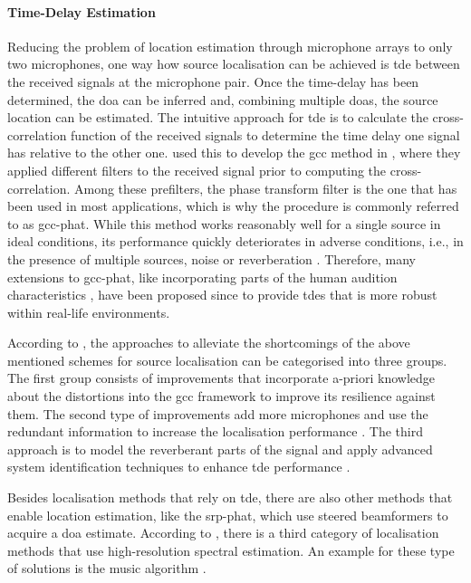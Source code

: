 \paragraph{Time-Delay Estimation}
 Reducing the problem of location estimation through microphone arrays to only two microphones, one way how source localisation can be achieved is \gls{tde} between the received signals at the microphone pair. Once the time-delay has been determined, the \gls{doa} can be inferred and, combining multiple \glspl{doa}, the source location can be estimated. The intuitive approach for \gls{tde} is to calculate the cross-correlation function of the received signals to determine the time delay one signal has relative to the other one. \citeauthor{Knapp1976} used this to develop the \gls{gcc} method in \cite{Knapp1976}, where they applied different filters to the received signal prior to computing the cross-correlation. Among these prefilters, the phase transform filter is the one that has been used in most applications, which is why the procedure is commonly referred to as \gls{gcc-phat}. While this method works reasonably well for a single source in ideal conditions, its performance quickly deteriorates in adverse conditions, i.e., in the presence of multiple sources, noise or reverberation \cite{Bedard1994,Champagne1996}. Therefore, many extensions to \gls{gcc-phat}, like incorporating parts of the human audition characteristics \cite{Wilson2006}, have been proposed since to provide \glspl{tde} that is more robust within real-life environments.
 
According to \cite{Chen2006}, the approaches to alleviate the shortcomings of the above mentioned schemes for source localisation can be categorised into three groups. The first group consists of improvements that incorporate a-priori knowledge about the distortions into the \gls{gcc} framework to improve its resilience against them. The second type of improvements add more microphones and use the redundant information to increase the localisation performance \cite{Brandstein1996,Silverman1997}. The third approach is to model the reverberant parts of the signal and apply advanced system identification techniques to enhance \gls{tde} performance \cite{Huang1999}.

Besides localisation methods that rely on \gls{tde}, there are also other methods that enable location estimation, like the \gls{srp-phat}, which use steered beamformers to acquire a \gls{doa} estimate. According to \cite{DiBiase2001}, there is a third category of localisation methods that use high-resolution spectral estimation. An example for these type of solutions is the \gls{music} algorithm \cite{Schmidt1986}.

